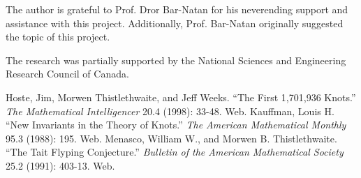 \begin{paper}


The author is grateful to Prof. Dror Bar-Natan for his neverending support and
assistance with this project.
Additionally, Prof. Bar-Natan originally suggested the topic of this project.

The research was partially supported by
the National Sciences and Engineering Research
Council of Canada.


\begin{thebibliography}{}
Hoste, Jim, Morwen Thistlethwaite, and Jeff Weeks.
``The First 1,701,936 Knots.''
\textit{The Mathematical Intelligencer}
20.4 (1998): 33-48. Web.
Kauffman, Louis H.
``New Invariants in the Theory of Knots.''
\textit{The American Mathematical Monthly}
95.3 (1988): 195. Web.
Menasco, William W., and Morwen B. Thistlethwaite.
``The Tait Flyping Conjecture.''
\textit{Bulletin of the American Mathematical Society}
25.2 (1991): 403-13. Web.
\end{thebibliography}

\end{paper}

